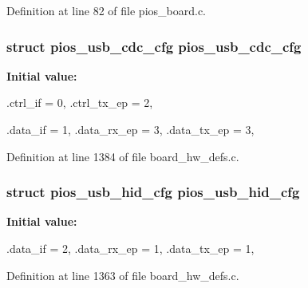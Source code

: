 \-Definition at line 82 of file pios\-\_\-board.\-c.

\hypertarget{group___copter_control_ga05cc3e449d417c7f9097d2659e6f5ca3}{
\subsubsection[{pios\-\_\-usb\-\_\-cdc\-\_\-cfg}]{\setlength{\rightskip}{0pt plus 5cm}struct {\bf pios\-\_\-usb\-\_\-cdc\-\_\-cfg} {\bf pios\-\_\-usb\-\_\-cdc\-\_\-cfg}}}\label{group___copter_control_ga05cc3e449d417c7f9097d2659e6f5ca3}
{\bfseries \-Initial value\-:}
\begin{DoxyCode}
 {
        .ctrl_if = 0,
        .ctrl_tx_ep = 2,

        .data_if = 1,
        .data_rx_ep = 3,
        .data_tx_ep = 3,
}
\end{DoxyCode}


\-Definition at line 1384 of file board\-\_\-hw\-\_\-defs.\-c.

\hypertarget{group___copter_control_ga3665f6d3a2cccc431b55b9432291e94c}{
\subsubsection[{pios\-\_\-usb\-\_\-hid\-\_\-cfg}]{\setlength{\rightskip}{0pt plus 5cm}struct {\bf pios\-\_\-usb\-\_\-hid\-\_\-cfg} {\bf pios\-\_\-usb\-\_\-hid\-\_\-cfg}}}\label{group___copter_control_ga3665f6d3a2cccc431b55b9432291e94c}
{\bfseries \-Initial value\-:}
\begin{DoxyCode}
 {
        .data_if = 2,
        .data_rx_ep = 1,
        .data_tx_ep = 1,
}
\end{DoxyCode}


\-Definition at line 1363 of file board\-\_\-hw\-\_\-defs.\-c.

